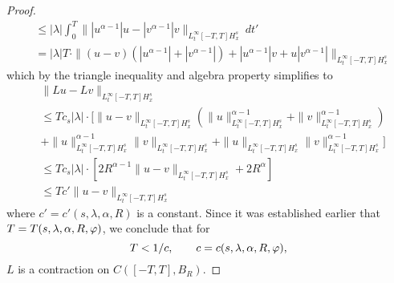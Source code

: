 \begin{proof}
\begin{equation*}
\begin{split}
    & \le |\lambda| \int_0^T \||u^{\alpha-1 }| u - | v^{\alpha - 1}| v
    \|_{L^\infty_t[-T, T] H^s_x} \ dt'
    \\
    & = |\lambda| T \cdot \|(u-v)(|u^{\alpha -1}| + |v^{\alpha -1}|) 
    + |u^{\alpha -1}|v 
    + u |v^{\alpha -1}| \|_{L^\infty_t[-T, T] H^s_x}
  \end{split}
\end{equation*}
%
%
which by the triangle inequality and algebra property simplifies to
%
%
\begin{equation}
  \label{L-contract}
  \begin{split}
    & \|Lu-Lv\|_{L^\infty_t[-T, T] H^s_x}
    \\
    & \le  T c_s |\lambda| \cdot \big [ \|u-v\|_{L^\infty_t[-T, T]
    H^s_x}(\|u\|^{\alpha -1}_{L^\infty_t[-T, T] H^s_x} +
    \|v\|^{\alpha -1}_{L^\infty_t[-T, T] H^s_x})
    \\
    & + \|u\|^{\alpha-1}_
    {L^\infty_t[-T, T] H^s_x} \|v\|_{L^\infty_t[-T, T] H^s_x}
    + \|u\|_
    {L^\infty_t[-T, T] H^s_x} \|v\|^{\alpha -1}_
    {L^\infty_t[-T, T] H^s_x} \big ]
    \\
    & \le T c_s |\lambda| \cdot \left[  2R^{\alpha -1} 
    \|u -v\|_{L^\infty_t[-T, T] H^s_x} + 2R^{\alpha} \right]
    \\
    & \le T c' \|u -v \|_{L^\infty_t[-T, T] 
    H^s_x}
  \end{split}
\end{equation}
%
%
where $c' = c'(s, \lambda, \alpha, R)$ is a constant.
Since it was established earlier that $T = T(s, \lambda, \alpha, R, \varphi)$,  
we conclude that for $$T < 1/c,  \qquad c = c(s, \lambda, \alpha, R, 
\varphi),$$ $L$ is a 
contraction on $C([-T, T], B_R)$. 
\end{proof}

%
%
%


